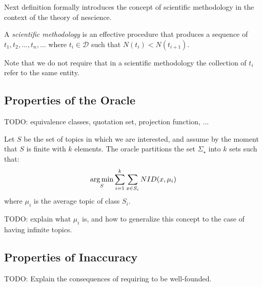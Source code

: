 Next definition formally introduces the concept of scientific methodology in the context of the theory of nescience.

\begin{definition}
A \emph{scientific methodology} is an effective procedure that produces a sequence of $t_1, t_2, \ldots, t_n, \ldots$ where $t_i \in \mathcal{D}$ such that $N(t_i) < N(t_{i+1})$.
\end{definition}

Note that we do not require that in a scientific methodology the collection of $t_i$ refer to the same entity.


\subsection{Properties of the Oracle}

{\color{red} TODO: equivalence classes, quotation set, projection function, ...}

Let $S$ be the set of topics in which we are interested, and assume by the moment that $S$ is finite with $k$ elements. The oracle partitions the set $\Sigma_\star$ into $k$ sets such that:
\[
\operatorname*{arg\,min}_S \sum_{i=1}^k \sum_{x \in S_i} NID(x, \mu_i)
\]
where $\mu_i$ is the average topic of class $S_i$.

{\color{red} TODO: explain what $\mu_i$ is, and how to generalize this concept to the case of having infinite topics.}


\subsection{Properties of Inaccuracy}

{\color{red} TODO: Explain the consequences of requiring to be well-founded.}


